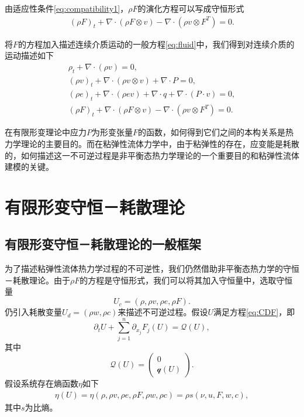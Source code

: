 由适应性条件\eqref{eq:compatibility1}，$\rho F$的演化方程可以写成守恒形式
\begin{eqnarray*}
(\rho F)_t + \nabla \cdot (\rho F \otimes v) - \nabla \cdot (\rho v \otimes F^T) = 0 .
\end{eqnarray*} 

将$F$的方程加入描述连续介质运动的一般方程\eqref{eq:fluid}中，我们得到对连续介质的运动描述如下
\begin{subequations}\label{eq:continuum}
\begin{align}
\rho_t + \nabla \cdot (\rho v )=0, \\
(\rho v)_t + \nabla \cdot (\rho v \otimes v) + \nabla \cdot P = 0, \\
(\rho e)_t + \nabla \cdot (\rho e v) + \nabla \cdot q + \nabla \cdot (P \cdot v) = 0 ,\\
(\rho F)_t + \nabla \cdot (\rho F \otimes v) - \nabla \cdot (\rho v \otimes F^T) = 0 .
\end{align}
\end{subequations}

在有限形变理论中应力$P$为形变张量$F$的函数，如何得到它们之间的本构关系是热力学理论的主要目的。而在粘弹性流体力学中，由于粘弹性的存在，应变能是耗散的，如何描述这一不可逆过程是非平衡态热力学理论的一个重要目的和粘弹性流体建模的关键。

\section{有限形变守恒－耗散理论}
\subsection{有限形变守恒－耗散理论的一般框架}
为了描述粘弹性流体热力学过程的不可逆性，我们仍然借助非平衡态热力学的守恒－耗散理论。由于$\rho F$的方程是守恒形式，我们可以将其加入守恒量中，选取守恒量
$$U_c = (\rho, \rho v, \rho e, \rho F).$$
仍引入耗散变量$U_d = (\rho w,\rho c)$来描述不可逆过程。假设$U$满足方程\eqref{eq:CDF}，即
\begin{equation}\label{eq:FCDF}
		\partial_t U + \sum_{j=1}^n \partial_{x_j} F_j(U) = \mathcal{Q} (U) ,
\end{equation}
其中
\begin{equation*}
	\mathcal{Q}(U) = \left( \begin{matrix}
		0 \\ \mathcal{q}(U)
	\end{matrix} \right).
\end{equation*}
假设系统存在熵函数$\eta$如下
\begin{eqnarray*}
\eta(U) = \eta(\rho, \rho v, \rho e,\rho F,\rho w, \rho c) = \rho s(\nu,u,F,w,c),
\end{eqnarray*}
其中$s$为比熵。

